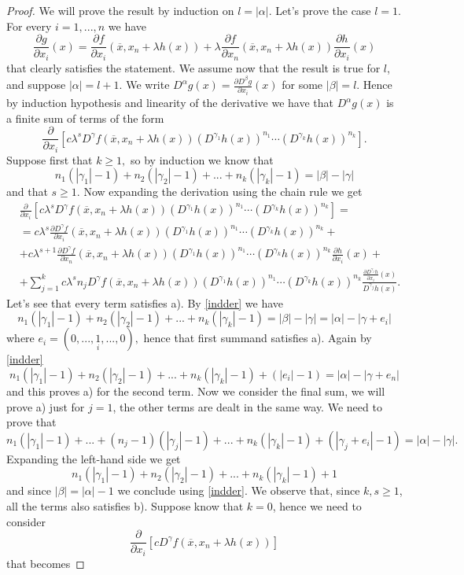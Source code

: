 \documentclass[12pt]{article}
\theoremstyle{definition}
\begin{document}
\begin{proof}
We will prove the result by induction on $l=|\alpha|.$ Let's prove the case $l=1$. For every $i=1,...,n$ we have
\[ \frac{\partial g}{\partial x_i}(x)=\frac{\partial f}{\partial x_i}(\overline x, x_n+\lambda h(x))+\lambda\frac{\partial f}{\partial x_n}(\overline x, x_n+\lambda h(x))\frac{\partial h}{\partial x_i}(x) \]
that clearly satisfies the statement. We assume now that the result is true for $l$, and suppose $|\alpha|=l+1$. We write $D^\alpha g(x)=\frac{\partial D^\beta g}{\partial x_i}(x)$ for some $|\beta|=l$. Hence by induction hypothesis and linearity of the derivative we have that $D^\alpha g(x)$ is a finite sum of terms of the form
\[ \frac{\partial}{\partial x_i} [c\lambda^s D^{\gamma} f(\overline x, x_n+\lambda h(x))(D^{\gamma_1}h(x))^{n_1}\cdots (D^{\gamma_k}h(x))^{n_k}].\]
Suppose first that $k\ge 1,$ so by induction we know that
\begin{equation}\label{indder}
 n_1(|\gamma_1|-1)+n_2(|\gamma_2|-1)+...+n_k(|\gamma_k|-1)=|\beta|-|\gamma| 
 \end{equation}
 and that $s\ge 1.$
 Now expanding the derivation using the chain rule we get
\begin{align*}
&\frac{\partial}{\partial x_i} [c\lambda^s D^{\gamma} f(\overline x, x_n+\lambda h(x))(D^{\gamma_1}h(x))^{n_1}\cdots (D^{\gamma_k}h(x))^{n_k}]=\\
&=c\lambda^s \frac{\partial D^{\gamma} f}{\partial x_i}  (\overline x, x_n+\lambda h(x))(D^{\gamma_1}h(x))^{n_1}\cdots (D^{\gamma_k}h(x))^{n_k}+\\
&+ c\lambda^{s+1} \frac{\partial D^{\gamma} f}{\partial x_n}  (\overline x, x_n+\lambda h(x))(D^{\gamma_1}h(x))^{n_1}\cdots (D^{\gamma_k}h(x))^{n_k}\frac{\partial h}{\partial x_i} (x)+\\
&+ \sum_{j=1}^k c\lambda^sn_j D^{\gamma} f(\overline x, x_n+\lambda h(x))(D^{\gamma_1}h(x))^{n_1}\cdots (D^{\gamma_k}h(x))^{n_k} \frac{\frac{\partial D^{\gamma_j}h}{\partial x_i} (x)}{D^{\gamma_j}h(x)}.
\end{align*}
Let's see that every term satisfies a). By \eqref{indder} we have
\[ n_1(|\gamma_1|-1)+n_2(|\gamma_2|-1)+...+n_k(|\gamma_k|-1)=|\beta|-|\gamma|=|\alpha|-|\gamma + e_i|\]
where $e_i=(0,...,\underset{i}1,...,0),$ hence that first summand satisfies a). Again by \eqref{indder}
\[ n_1(|\gamma_1|-1)+n_2(|\gamma_2|-1)+...+n_k(|\gamma_k|-1)+(|e_i|-1)=|\alpha|-|\gamma + e_n|\]
and this proves a) for the second term. Now we consider the final sum, we will prove a) just for $j=1$, the other terms are dealt in the same way. We need to prove that
\[ n_1(|\gamma_1|-1)+...+(n_j-1)(|\gamma_j|-1)+...+n_k(|\gamma_k|-1)+(|\gamma_j+e_i|-1)=|\alpha|-|\gamma|. \]
Expanding the left-hand side we get
\[ n_1(|\gamma_1|-1)+n_2(|\gamma_2|-1)+...+n_k(|\gamma_k|-1)+1\]
and since $|\beta|=|\alpha|-1$ we conclude using \eqref{indder}. We observe that, since $k,s\ge1$, all the terms also satisfies b). Suppose know that $k=0$, hence we need to consider
\[ \frac{\partial}{\partial x_i} [c D^{\gamma} f(\overline x, x_n+\lambda h(x)) ]\]
that becomes


\end{proof}
\end{document}
